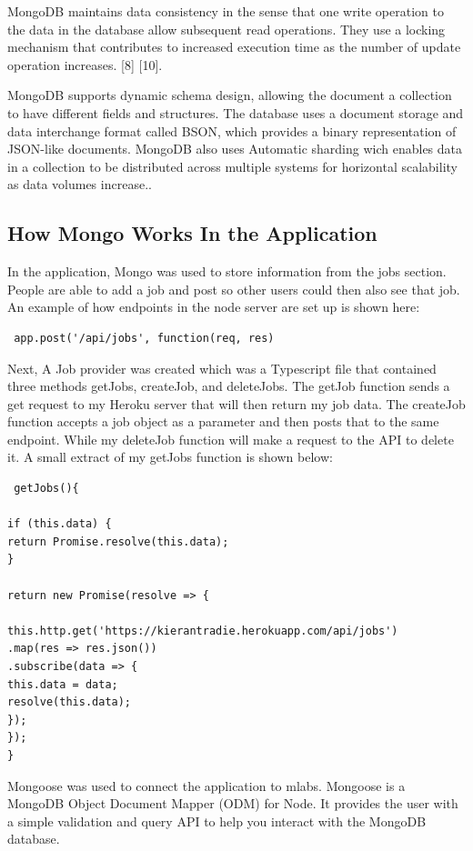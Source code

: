 MongoDB maintains data consistency in the
sense that one write operation to the data in the database allow subsequent
read operations. They use a locking mechanism that contributes to increased
execution time as the number of update operation increases. [8] [10].

MongoDB supports dynamic schema design, allowing the document a collection to have different fields and structures. The database uses a document storage and data interchange format called BSON, which provides a binary representation of JSON-like documents. MongoDB also uses Automatic sharding wich enables data in a collection to be distributed across multiple systems for horizontal scalability as data volumes increase.\cite{MongoDB}.


\subsection{How Mongo Works In the Application}
In the application, Mongo was used to store information from the jobs section. People are able to add a job and post so other users could then also see that job. An example of how endpoints in the node server are set up is shown here:

\begin{verbatim}
 app.post('/api/jobs', function(req, res)
\end{verbatim}

Next, A Job provider was created which was a Typescript file that contained three methods getJobs, createJob, and deleteJobs. The getJob function sends a get request to my Heroku server that will then return my job data. The createJob function accepts a job object as a parameter and then posts that to the same endpoint. While my deleteJob function will make a request to the API to delete it. A small extract of my getJobs function is shown below:

\begin{verbatim}
 getJobs(){

if (this.data) {
return Promise.resolve(this.data);
}

return new Promise(resolve => {

this.http.get('https://kierantradie.herokuapp.com/api/jobs')
.map(res => res.json())
.subscribe(data => {
this.data = data;
resolve(this.data);
});
});
}
\end{verbatim}

Mongoose was used to connect the application to mlabs. Mongoose is a MongoDB Object Document Mapper (ODM) for Node. It provides the user with a simple validation and query API to help you interact with the MongoDB database.

